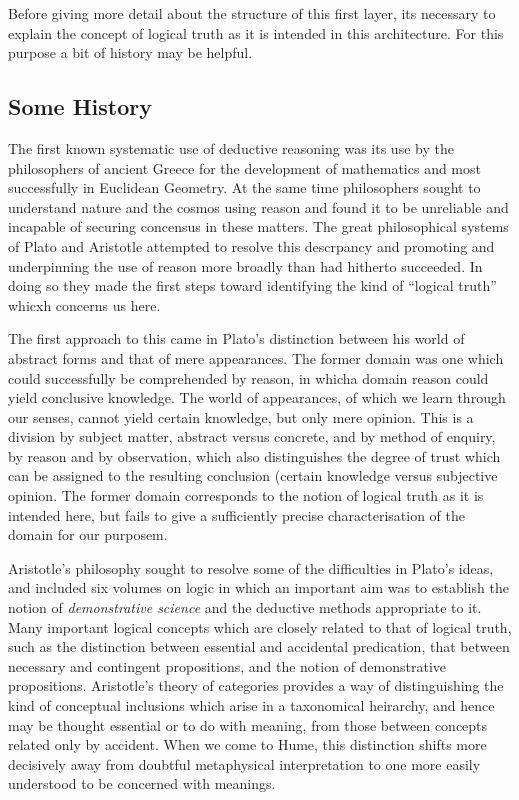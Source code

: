 \documentclass[10pt,titlepage]{book}
\begin{document}
Before giving more detail about the structure of this first layer, its necessary to explain the concept of logical truth as it is intended in this architecture.
For this purpose a bit of history may be helpful.

\subsection{Some History}

The first known systematic use of deductive reasoning was its use by the philosophers of ancient Greece for the development of mathematics and most successfully in Euclidean Geometry.
At the same time philosophers sought to understand nature and the cosmos using reason and found it to be unreliable and incapable of securing concensus in these matters.
The great philosophical systems of Plato and Aristotle attempted to resolve this descrpancy and promoting and underpinning  the use of reason more broadly than had hitherto succeeded.
In doing so they made the first steps toward identifying the kind of ``logical truth'' whicxh concerns us here.

The first approach to this came in Plato's distinction between his world of abstract forms and that of mere appearances.
The former domain was one which could successfully be comprehended by reason, in whicha domain reason could yield conclusive knowledge.
The world of appearances, of which we learn through our senses, cannot yield certain knowledge, but only mere opinion.
This is a division by subject matter, abstract versus concrete, and by method of enquiry, by reason and by observation, which also distinguishes the degree of trust which can be assigned to the resulting conclusion (certain knowledge versus subjective opinion.
The former domain corresponds to the notion of logical truth as it is intended here, but fails to give a sufficiently precise characterisation of the domain for our purposem.

Aristotle's philosophy sought to resolve some of the difficulties in Plato's ideas, and included six volumes on logic in which an important aim was to establish the notion of \emph{demonstrative science} and the deductive methods appropriate to it.
Many important logical concepts which are closely related to that of logical truth, such as the distinction between essential and accidental predication, that between necessary and contingent propositions, and the notion of demonstrative propositions.
Aristotle's theory of categories provides a way of distinguishing the kind of conceptual inclusions which arise in a taxonomical heirarchy, and hence may be thought essential or to do with meaning, from those between concepts related only by accident.
When we come to Hume, this distinction shifts more decisively away from doubtful metaphysical interpretation to one more easily understood to be concerned with meanings.
\end{document}
